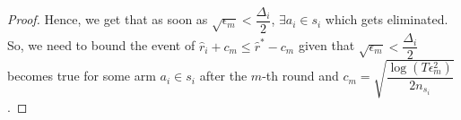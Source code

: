\begin{proof}
\newline Hence, we get that as soon as $\sqrt{\epsilon_{m}}<\dfrac{\Delta_{i}}{2}$, $\exists a_{i}\in s_{i}$ which gets eliminated.
\newline So, we need to bound the event of $\hat{r}_{i}+c_{m}\leq \hat{r}^{*}-c_{m}$ given that $\sqrt{\epsilon_{m}}<\dfrac{\Delta_{i}}{2}$ becomes true for some arm $a_{i}\in s_{i}$ after the $m$-th round and $c_{m}=\sqrt{\dfrac{\log (T\epsilon_{m}^{2})}{2 n_{s_{i}}}}$.


\end{proof}
